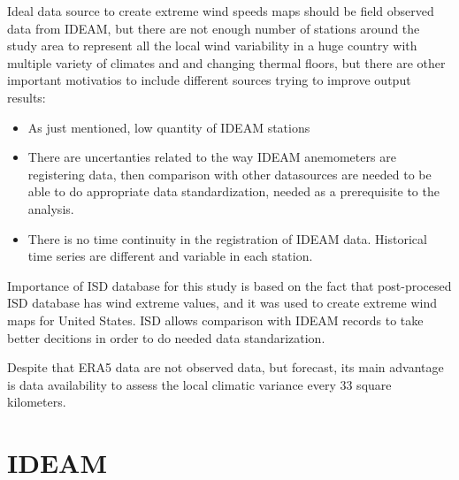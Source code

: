 \documentclass[12pt,twoside]{reedthesis}
\providecommand{\tightlist}{%
  \setlength{\itemsep}{0pt}\setlength{\parskip}{0pt}}
\begin{document}
Ideal data source to create extreme wind speeds maps should be field observed data from IDEAM, but there are not enough number of stations around the study area to represent all the local wind variability in a huge country with multiple variety of climates and and changing thermal floors, but there are other important motivatios to include different sources trying to improve output results:
\begin{itemize}
\tightlist
\item
  As just mentioned, low quantity of IDEAM stations
\item
  There are uncertanties related to the way IDEAM anemometers are registering data, then comparison with other datasources are needed to be able to do appropriate data standardization, needed as a prerequisite to the analysis.
\item
  There is no time continuity in the registration of IDEAM data. Historical time series are different and variable in each station.
\end{itemize}
Importance of ISD database for this study is based on the fact that post-procesed ISD database has wind extreme values, and it was used to create extreme wind maps for United States. ISD allows comparison with IDEAM records to take better decitions in order to do needed data standarization.

Despite that ERA5 data are not observed data, but forecast, its main advantage is data availability to assess the local climatic variance every 33 square kilometers.

\hypertarget{ideam}{%
\section{IDEAM}\label{ideam}}
\end{document}
